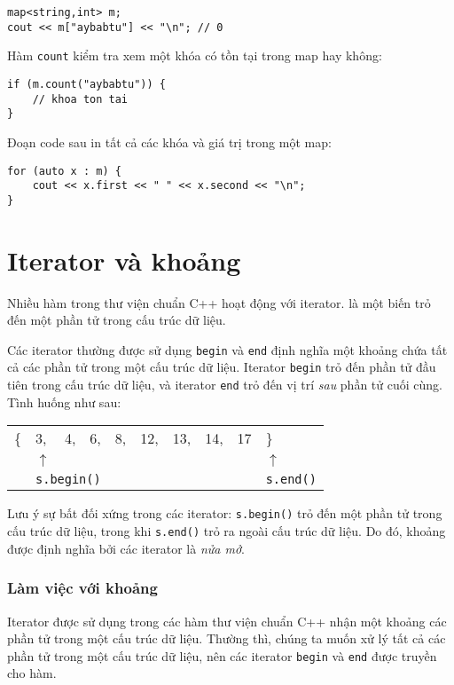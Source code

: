 \begin{lstlisting}
map<string,int> m;
cout << m["aybabtu"] << "\n"; // 0
\end{lstlisting}
Hàm \texttt{count} kiểm tra
xem một khóa có tồn tại trong map hay không:
\begin{lstlisting}
if (m.count("aybabtu")) {
    // khoa ton tai
}
\end{lstlisting}
Đoạn code sau in tất cả các khóa và giá trị
trong một map:
\begin{lstlisting}
for (auto x : m) {
    cout << x.first << " " << x.second << "\n";
}
\end{lstlisting}

\section{Iterator và khoảng}


Nhiều hàm trong thư viện chuẩn C++
hoạt động với iterator.
 là một biến trỏ đến
một phần tử trong cấu trúc dữ liệu.

Các iterator thường được sử dụng \texttt{begin}
và \texttt{end} định nghĩa một khoảng chứa
tất cả các phần tử trong một cấu trúc dữ liệu.
Iterator \texttt{begin} trỏ đến
phần tử đầu tiên trong cấu trúc dữ liệu,
và iterator \texttt{end} trỏ đến
vị trí \emph{sau} phần tử cuối cùng.
Tình huống như sau:

\begin{center}
\begin{tabular}{llllllllll}
\{ & 3, & 4, & 6, & 8, & 12, & 13, & 14, & 17 & \} \\
& $\uparrow$ & & & & & & & & $\uparrow$ \\
& \multicolumn{3}{l}{\texttt{s.begin()}} & & & & & & \texttt{s.end()} \\
\end{tabular}
\end{center}

Lưu ý sự bất đối xứng trong các iterator:
\texttt{s.begin()} trỏ đến một phần tử trong cấu trúc dữ liệu,
trong khi \texttt{s.end()} trỏ ra ngoài cấu trúc dữ liệu.
Do đó, khoảng được định nghĩa bởi các iterator là \emph{nửa mở}.

\subsubsection{Làm việc với khoảng}

Iterator được sử dụng trong các hàm thư viện chuẩn C++
nhận một khoảng các phần tử trong một cấu trúc dữ liệu.
Thường thì, chúng ta muốn xử lý tất cả các phần tử trong một
cấu trúc dữ liệu, nên các iterator
\texttt{begin} và \texttt{end} được truyền cho hàm.

